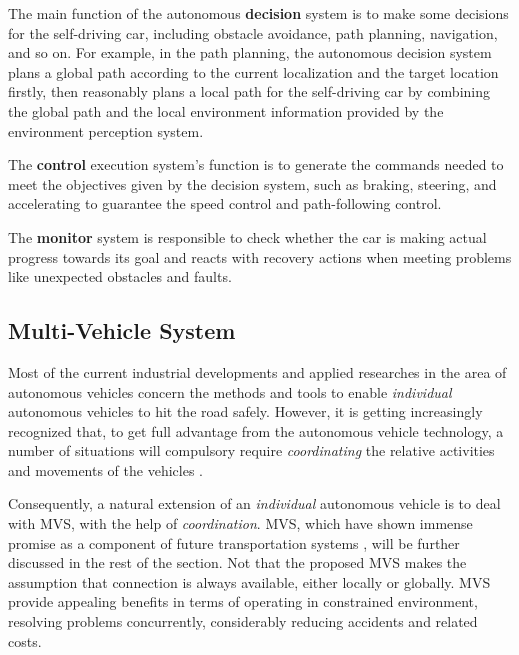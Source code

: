 The main function of the autonomous \textbf{decision} system is to make some decisions for the self-driving car, including obstacle avoidance, path planning, navigation, and so on. For example, in the path planning, the autonomous decision system plans a global path according to the current localization and the target location firstly, then reasonably plans a local path for the self-driving car by combining the global path and the local environment information provided by the environment perception system.   

The \textbf{control} execution system's function is to generate the commands needed to meet the objectives given by the decision system, such as braking, steering, and accelerating to guarantee the speed control and path-following control. 

The \textbf{monitor} system is responsible to check whether the car is making actual progress towards its goal and reacts with recovery actions when meeting problems like unexpected obstacles and  faults.

\subsection{Multi-Vehicle System} \label{sec: MVS_control_Architecture}
Most of the current industrial developments and applied researches in the area of autonomous vehicles concern the methods and tools to enable \textit{individual} autonomous vehicles to hit the road safely. However, it is getting increasingly recognized that, to get full advantage from the autonomous vehicle technology, a number of situations will compulsory require \textit{coordinating} the relative activities and movements of the vehicles \cite{10.1007/978-3-030-03424-5_6} \cite{6949576}.


Consequently, a natural extension of an \textit{individual} autonomous vehicle is to deal with MVS, with the help of \textit{coordination}. MVS, which have shown immense promise as a component of future transportation systems \cite{chai2017connected} \cite{C-Roads} \cite{sjoberg2017cooperative}, will be further discussed in the rest of the section. Not that the proposed MVS makes the assumption that connection is always available, either locally or globally. MVS provide appealing benefits in terms of operating in constrained environment, resolving problems concurrently, considerably reducing accidents and related costs.   


